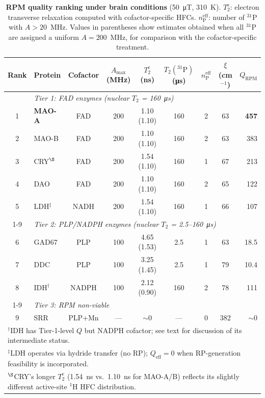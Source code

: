 \documentclass[11pt]{article}
\begin{document}
\begin{table}[p]
\centering
\caption{\textbf{RPM quality ranking under brain conditions} (50~\si{\micro\tesla}, 310~K). $T_2^e$: electron transverse relaxation computed with cofactor-specific HFCs. $n_\mathrm{P}^\mathrm{eff}$: number of $^{31}$P with $A > 20$~MHz. Values in parentheses show estimates obtained when all $^{31}$P are assigned a uniform $A = 200$~MHz, for comparison with the cofactor-specific treatment.}
\label{tab:ranking}
\small
\begin{tabular}{@{}clccccccr@{}}
\toprule
Rank & Protein & Cofactor & $A_\mathrm{max}$ (MHz) & $T_2^e$ (ns) & $T_2(^{31}\mathrm{P})$ (\si{\micro\second}) & $n_\mathrm{P}^\mathrm{eff}$ & $\xi$ (cm$^{-1}$) & $Q_\mathrm{RPM}$ \\
\midrule
 & \multicolumn{8}{l}{\textit{Tier 1: FAD enzymes (nuclear $T_2$ = 160~\si{\micro\second})}} \\
1 & \textbf{MAO-A}  & FAD    & 200 & 1.10 (1.10) & 160 & 2 & 63  & \textbf{457} \\
2 & MAO-B  & FAD    & 200 & 1.10 (1.10) & 160 & 2 & 63  & 383 \\
3 & CRY$^\S$    & FAD    & 200 & 1.54 (1.10) & 160 & 1 & 67  & 213 \\
4 & DAO    & FAD    & 200 & 1.10 (1.10) & 160 & 2 & 65  & 122 \\
5 & LDH$^\ddagger$    & NADH   & 200 & 1.54 (1.10) & 160 & 1 & 66  & 107 \\
\cmidrule{1-9}
 & \multicolumn{8}{l}{\textit{Tier 2: PLP/NADPH enzymes (nuclear $T_2$ = 2.5--160~\si{\micro\second})}} \\
6 & GAD67  & PLP    & 100  & 4.65 (1.53) & 2.5 & 1 & 63  & 18.5 \\
7 & DDC    & PLP    & 100  & 3.25 (1.45) & 2.5 & 1 & 79  & 10.4 \\
8 & IDH$^\dagger$    & NADPH  & 100 & 2.12 (0.90) & 160 & 2 & 78  & 111 \\
\cmidrule{1-9}
 & \multicolumn{8}{l}{\textit{Tier 3: RPM non-viable}} \\
9 & SRR    & PLP+Mn & --- & $\sim$0   & --- & 0 & 382 & $\sim$0 \\
\bottomrule
\multicolumn{9}{l}{\footnotesize $^\dagger$IDH has Tier-1-level $Q$ but NADPH cofactor; see text for discussion of its intermediate status.} \\
\multicolumn{9}{l}{\footnotesize $^\ddagger$LDH operates via hydride transfer (no RP); $Q_\mathrm{eff} = 0$ when RP-generation feasibility is incorporated.} \\
\multicolumn{9}{l}{\footnotesize $^\S$CRY's longer $T_2^e$ (1.54~ns vs.\ 1.10~ns for MAO-A/B) reflects its slightly different active-site $^1$H HFC distribution.}
\end{tabular}
\end{table}
\end{document}
